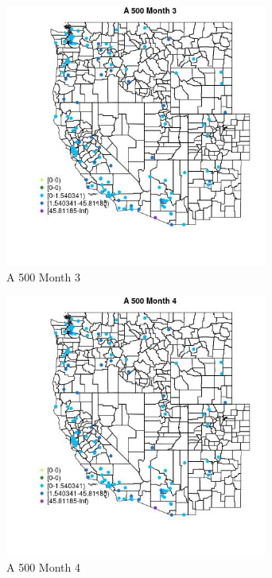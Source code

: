 \begin{figure} 
\centering  
\includegraphics[width=0.77\textwidth]{Code_Outputs/Report_ML_input_PM25_Step4_part_e_de_duplicated_aves_MapObsMo3A_500.jpg} 
\caption{\label{fig:Report_ML_input_PM25_Step4_part_e_de_duplicated_avesMapObsMo3A_500}A 500 Month 3} 
\end{figure} 
 

\begin{figure} 
\centering  
\includegraphics[width=0.77\textwidth]{Code_Outputs/Report_ML_input_PM25_Step4_part_e_de_duplicated_aves_MapObsMo4A_500.jpg} 
\caption{\label{fig:Report_ML_input_PM25_Step4_part_e_de_duplicated_avesMapObsMo4A_500}A 500 Month 4} 
\end{figure} 
 

